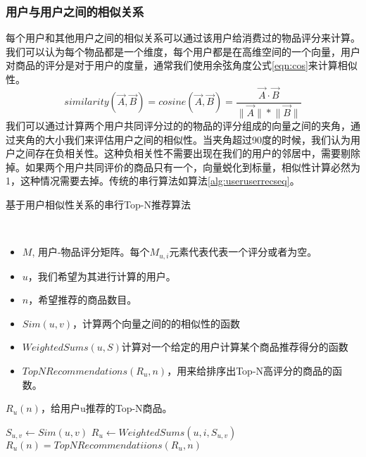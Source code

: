 \subsubsection{用户与用户之间的相似关系}
每个用户和其他用户之间的相似关系可以通过该用户给消费过的物品评分来计算。我们可以认为每个物品都是一个维度，每个用户都是在高维空间的一个向量，用户对商品的评分是对于用户的度量，通常我们使用余弦角度公式\ref{eqn:cos}来计算相似性。
    \begin{equation}\label{eqn:cos}
       similarity(\vec{A}, \vec{B}) = cosine(\vec{A}, \vec{B}) = \frac{\vec{A} \cdot \vec{B}}{\lVert\vec{A}\rVert\ast\lVert\vec{B}\rVert}
    \end{equation}
    我们可以通过计算两个用户共同评分过的的物品的评分组成的向量之间的夹角，通过夹角的大小我们来评估用户之间的相似性。当夹角超过90度的时候，我们认为用户之间存在负相关性。这种负相关性不需要出现在我们的用户的邻居中，需要剔除掉。如果两个用户共同评价的商品只有一个，向量蜕化到标量，相似性计算必然为1，这种情况需要去掉。传统的串行算法如算法\ref{alg:useruserrecseq}。

 \begin{algorithm}
        \caption{基于用户相似性关系的串行Top-N推荐算法}\label{alg:useruserrecseq}
        \begin{algorithmic}[1] %
            \Require \\
            \begin{itemize}
                \item $M$, 用户-物品评分矩阵。每个$M_{u,i}$元素代表代表一个评分或者为空。
                \item $u$，我们希望为其进行计算的用户。
                \item $n$，希望推荐的商品数目。
                \item $Sim(u, v)$，计算两个向量之间的的相似性的函数
                \item $WeightedSums(u, S)$计算对一个给定的用户计算某个商品推荐得分的函数
                \item $TopNRecommendations(R_u, n)$，用来给排序出Top-N高评分的商品的函数。
            \end{itemize}
            \Ensure $R_u(n)$，给用户u推荐的Top-N商品。

        
                    \State $S_{u, v} \leftarrow Sim(u, v)$
                \EndIf 
                        \State $R_u \leftarrow WeightedSums(u, i, S_{u, v})$
                    \EndIf
                \EndFor
            \EndFor 
            \State $R_u(n) = TopNRecommendatiions(R_u, n)$
        \end{algorithmic}
    \end{algorithm}

